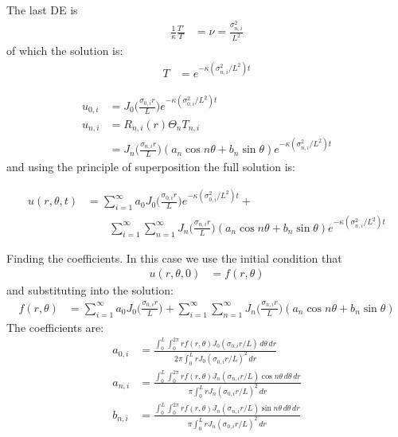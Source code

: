 The last DE is
%
\begin{align*}
\frac{1}{\kappa} \frac{T'}{T} & = \nu = \frac{\sigma_{n,i}^2}{L^2}
\end{align*}
of which the solution is: 
%
\begin{align*}
T & = e^{-\kappa (\sigma_{n,i}^2/L^2) t}  
\end{align*}


\begin{align*}
u_{0,i} & = J_0\biggl(\frac{\sigma_{0,i} r}{L} \biggr) e^{-\kappa (\sigma_{0,i}^2/L^2) t}  \\
u_{n,i} & = R_{n,i}(r) \Theta_n T_{n,i} \\
& = J_n\biggl(\frac{\sigma_{n,i} r}{L} \biggr) (a_n \cos n \theta + b_n \sin \theta) e^{-\kappa (\sigma_{n,i}^2/L^2) t}  
\end{align*}
and using the principle of superposition the full solution is:

%
\begin{align*}
u(r,\theta,t) & = \sum_{i=1}^{\infty} a_0 J_0\biggl(\frac{\sigma_{0,i} r}{L} \biggr) e^{-\kappa (\sigma_{0,i}^2/L^2) t}  + \\
& \qquad \sum_{i=1}^{\infty}  \sum_{n=1}^{\infty} J_n\biggl(\frac{\sigma_{n,i} r}{L} \biggr) ( a_n \cos n \theta + b_n \sin \theta) e^{-\kappa (\sigma_{n,i}^2/L^2) t}  
\end{align*}

Finding the coefficients.  In this case we use the initial condition that 
%
\begin{align*}
u(r,\theta,0) & = f(r,\theta) 
\end{align*}
and substituting into the solution:
%
\begin{align*}
f(r,\theta) & = \sum_{i=1}^{\infty} a_0 J_0\biggl(\frac{\sigma_{0,i} r}{L} \biggr) + 
 \sum_{i=1}^{\infty}  \sum_{n=1}^{\infty} J_n\biggl(\frac{\sigma_{n,i} r}{L} \biggr) ( a_n \cos n \theta + b_n \sin \theta)
 \end{align*}
The coefficients are:
%
\begin{align*}
a_{0,i} & = \frac{\int_0^L \int_0^{2\pi} r f(r,\theta) J_0(\sigma_{0,i} r/L) \,d\theta \, dr}
{2\pi \int_0^L  r J_0(\sigma_{0,i} r/L)^2  \, dr}\\
a_{n,i} & = \frac{\int_0^L \int_0^{2\pi} r f(r,\theta) J_n(\sigma_{n,i} r/L)\cos n\theta \,d\theta \, dr}
{\pi \int_0^L  r J_n(\sigma_{0,i} r/L)^2  \, dr} \\
b_{n,i} & = \frac{\int_0^L \int_0^{2\pi} r f(r,\theta) J_n(\sigma_{n,i} r/L)\sin n\theta \,d\theta \, dr}
{\pi \int_0^L  r J_n(\sigma_{0,i} r/L)^2  \, dr}
\end{align*}


